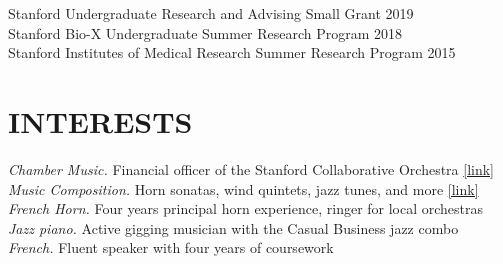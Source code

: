 \documentclass[margin, 10pt]{res}
\begin{document}
\begin{resume}
Stanford Undergraduate Research and Advising Small Grant \hfill 2019 \\
Stanford Bio-X Undergraduate Summer Research Program \hfill 2018 \\
Stanford Institutes of Medical Research Summer Research Program \hfill 2015

\section{INTERESTS}

\textit{Chamber Music.} Financial officer of the Stanford Collaborative Orchestra \href{https://scor.stanford.edu}{[link]} \\
\textit{Music Composition.} Horn sonatas, wind quintets, jazz tunes, and more \href{https://stanford.edu/~jeffjar/music.html}{[link]} \\
\textit{French Horn.} Four years principal horn experience, ringer for local orchestras \\
\textit{Jazz piano.} Active gigging musician with the Casual Business jazz combo \\
\textit{French.} Fluent speaker with four years of coursework

\end{resume}
\end{document}
